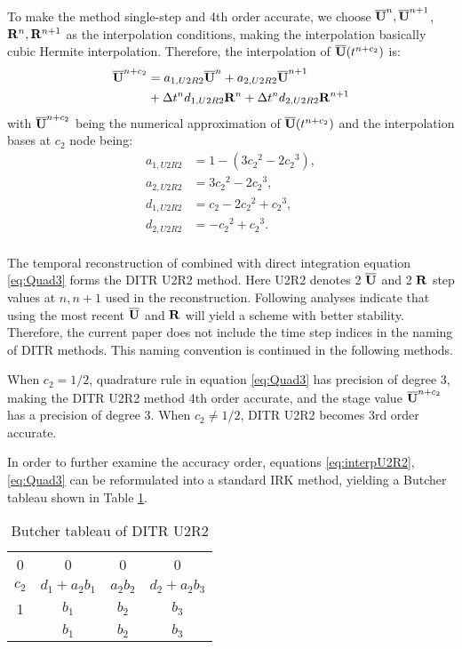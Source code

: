 \documentclass[preprint,12pt]{elsarticle}
\begin{document}
To make the method single-step and 4th order accurate,
we choose $\overline{\mathbf{U}}^{n},\overline{\mathbf{U}}^{n+1}$, $\mathbf{R}^{n},\mathbf{R}^{n+1}$ as
the interpolation conditions, making the interpolation
basically cubic Hermite interpolation.
Therefore, the interpolation of $\overline{\mathbf{U}}(t^{n+c_2})$
is:
\begin{equation}
    \begin{aligned}
        \label{eq:TRU2R2}
        \overline{\mathbf{U}}^{n+c_2} & =
        a_{1,U2R2}\overline{\mathbf{U}}^{n} +
        a_{2,U2R2}\overline{\mathbf{U}}^{n + 1}
        \\ & +
        \mathrm\Delta t^n d_{1,U2R2}\mathbf{R}^{n} +
        \mathrm\Delta t^n d_{2,U2R2}\mathbf{R}^{n + 1}
    \end{aligned}
\end{equation}
with $\overline{\mathbf{U}}^{n+c_2}$ being
the numerical approximation
of $\overline{\mathbf{U}}(t^{n+c_2})$
and the interpolation bases at $c_2$ node being:
\begin{equation}
    \begin{aligned}
        a_{1,U2R2} & = 1 - (3{c_2}^2 - 2 {c_2}^3) , \\
        a_{2,U2R2} & = 3{c_2}^2 - 2 {c_2}^3 ,       \\
        d_{1,U2R2} & = {c_2} - 2 {c_2}^2 + {c_2}^3, \\
        d_{2,U2R2} & = - {c_2}^2 + {c_2}^3 .        \\
    \end{aligned}
    \label{eq:interpU2R2}
\end{equation}

The temporal reconstruction of 
combined with direct integration equation \eqref{eq:Quad3}
forms the DITR U2R2 method. 
Here U2R2 denotes 2 $\overline{\mathbf{U}}$ and 2 $\mathbf{R}$
step values at $n,n+1$ used in the reconstruction.
Following analyses indicate that using 
the most recent $\overline{\mathbf{U}}$ and $\mathbf{R}$ 
will yield a scheme with better stability.
Therefore, the current paper does not include the 
time step indices in the naming of DITR methods. 
This naming convention is continued in the following 
methods.

When $c_2=1/2$, quadrature rule in equation \eqref{eq:Quad3} has precision
of degree 3, making the DITR U2R2 method 4th order accurate,
and the stage value $\overline{\mathbf{U}}^{n+c_2}$ has a precision of degree 3.
When $c_2\neq1/2$, DITR U2R2 becomes 3rd order accurate.

In order to further examine the accuracy order,
equations \eqref{eq:interpU2R2}, \eqref{eq:Quad3}
can be reformulated into a standard IRK method,
yielding a Butcher tableau shown in Table \ref{tab:U2R2Butcher}.
\begin{table}[htbp]
    \centering
    \begin{tabular}{c|ccc}
        0     & 0              & 0        & 0              \\
        $c_2$ & $d_1 + a_2b_1$ & $a_2b_2$ & $d_2 + a_2b_3$ \\
        1     & $b_1$          & $b_2$    & $b_3$          \\ \hline
              & $b_1$          & $b_2$    & $b_3$
    \end{tabular}
    \caption{Butcher tableau of DITR U2R2}
    \label{tab:U2R2Butcher}
\end{table}
\end{document}
